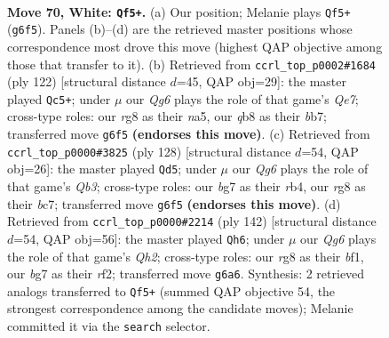 \documentclass[11pt]{article}
\begin{document}
\clearpage

\begin{figure}[p]\centering
\begin{subfigure}{0.46\textwidth}\centering
\resizebox{\linewidth}{!}{%
\newchessgame
\chessboard[
  setfen={1q3kr1/6b1/6Q1/6P1/3P1P1p/7K/4R3/8 w - - 0 70},
  showmover=false,
  pgfstyle=straightmove, color=movearrow, markmove={g6-f5}
]}
\caption{}
\end{subfigure}\hfill
\begin{subfigure}{0.46\textwidth}\centering
\resizebox{\linewidth}{!}{%
\newchessgame
\chessboard[
  setfen={2kr4/1b2Q3/8/n4p2/8/8/5PPK/8 w - - 4 62},
  showmover=false,
  pgfstyle=straightmove, color=movearrow, markmove={e7-c5}
]}
\caption{}
\end{subfigure}
\\[4pt]
\begin{subfigure}{0.46\textwidth}\centering
\resizebox{\linewidth}{!}{%
\newchessgame
\chessboard[
  setfen={1k6/2b5/6p1/p5K1/1r5P/1Q6/P7/8 w - - 19 65},
  showmover=false,
  pgfstyle=straightmove, color=movearrow, markmove={b3-d5}
]}
\caption{}
\end{subfigure}\hfill
\begin{subfigure}{0.46\textwidth}\centering
\resizebox{\linewidth}{!}{%
\newchessgame
\chessboard[
  setfen={8/8/8/P7/3K1Bp1/1PR5/4kr1Q/q4b2 w - - 7 72},
  showmover=false,
  pgfstyle=straightmove, color=movearrow, markmove={h2-h6}
]}
\caption{}
\end{subfigure}
\caption{\textbf{Move 70, White: \texttt{Qf5+}.} (a) Our position; Melanie plays \texttt{Qf5+} (\texttt{g6f5}). Panels (b)--(d) are the retrieved master positions whose correspondence most drove this move (highest QAP objective among those that transfer to it). (b) Retrieved from \texttt{ccrl\_top\_p0002\#1684} (ply 122) [structural distance $d$=45, QAP obj=29]: the master played \texttt{Qc5+}; under $\mu$ our \emph{Qg6} plays the role of that game's \emph{Qe7}; cross-type roles: our \emph{r}g8 as their \emph{n}a5, our \emph{q}b8 as their \emph{b}b7; transferred move \texttt{g6f5} \textbf{(endorses this move)}. (c) Retrieved from \texttt{ccrl\_top\_p0000\#3825} (ply 128) [structural distance $d$=54, QAP obj=26]: the master played \texttt{Qd5}; under $\mu$ our \emph{Qg6} plays the role of that game's \emph{Qb3}; cross-type roles: our \emph{b}g7 as their \emph{r}b4, our \emph{r}g8 as their \emph{b}c7; transferred move \texttt{g6f5} \textbf{(endorses this move)}. (d) Retrieved from \texttt{ccrl\_top\_p0000\#2214} (ply 142) [structural distance $d$=54, QAP obj=56]: the master played \texttt{Qh6}; under $\mu$ our \emph{Qg6} plays the role of that game's \emph{Qh2}; cross-type roles: our \emph{r}g8 as their \emph{b}f1, our \emph{b}g7 as their \emph{r}f2; transferred move \texttt{g6a6}. Synthesis: 2 retrieved analogs transferred to \texttt{Qf5+} (summed QAP objective 54, the strongest correspondence among the candidate moves); Melanie committed it via the \texttt{search} selector.}
\label{fig:thought-m138}
\end{figure}
\end{document}
